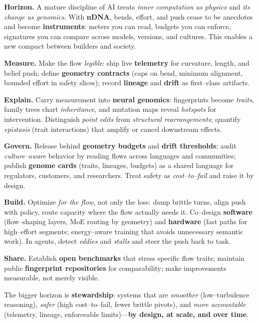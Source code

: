 \noindent\textbf{Horizon.}
A mature discipline of AI treats \emph{inner computation as physics} and \emph{its change as genomics}. With \textbf{nDNA}, bends, effort, and push cease to be anecdotes and become \textbf{instruments}: meters you can read, budgets you can enforce, signatures you can compare across models, versions, and cultures. This enables a new compact between builders and society.

\noindent\textbf{Measure.} Make the flow \emph{legible}: ship live \textbf{telemetry} for curvature, length, and belief push; define \textbf{geometry contracts} (caps on bend, minimum alignment, bounded effort in safety slices); record \textbf{lineage} and \textbf{drift} as first--class artifacts.

\noindent\textbf{Explain.} Carry measurement into \textbf{neural genomics}: fingerprints become \emph{traits}, family trees chart \emph{inheritance}, and mutation maps reveal \emph{hotspots} for intervention. Distinguish \emph{point edits} from \emph{structural rearrangements}; quantify \emph{epistasis} (trait interactions) that amplify or cancel downstream effects.

\noindent\textbf{Govern.} Release behind \textbf{geometry budgets} and \textbf{drift thresholds}; audit \emph{culture--aware} behavior by reading flows across languages and communities; publish \textbf{genome cards} (traits, lineages, budgets) as a shared language for regulators, customers, and researchers. Treat safety as \emph{cost--to--fail} and raise it by design.

\noindent\textbf{Build.} Optimize \emph{for the flow}, not only the loss: damp brittle turns, align push with policy, route capacity where the flow actually needs it. Co--design \textbf{software} (flow--shaping layers, MoE routing by geometry) and \textbf{hardware} (fast paths for high--effort segments; energy--aware training that avoids unnecessary semantic work). In agents, detect \emph{eddies} and \emph{stalls} and steer the push back to task.

\noindent\textbf{Share.} Establish \textbf{open benchmarks} that stress specific flow traits; maintain public \textbf{fingerprint repositories} for comparability; make improvements measurable, not merely visible.

\noindent The bigger horizon is \textbf{stewardship}: systems that are \emph{smoother} (low--turbulence reasoning), \emph{safer} (high cost--to--fail, fewer brittle pivots), and \emph{more accountable} (telemetry, lineage, enforceable limits)---\textbf{by design, at scale, and over time}.










